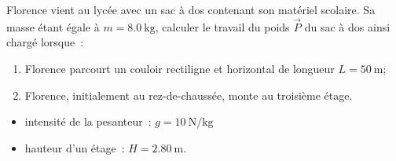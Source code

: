 Florence vient au lycée avec un sac à dos contenant son matériel scolaire. Sa
masse étant égale à $m=\qty{8.0}{\kg}$, calculer le travail du poids $\vec{P}$
du sac à dos ainsi chargé lorsque~:
\begin{enumerate}
    \item Florence parcourt un couloir rectiligne et horizontal de longueur
          $L=\qty{50}{\m}$;
    \item Florence, initialement au rez-de-chaussée, monte au troisième étage.
\end{enumerate}
\begin{donnees}
    \begin{itemize}
        \item intensité de la pesanteur~: $g=\qty{10}{\N\per\kg}$
        \item hauteur d'un étage~: $H=\qty{2.80}{\m}$.
    \end{itemize}
\end{donnees}

